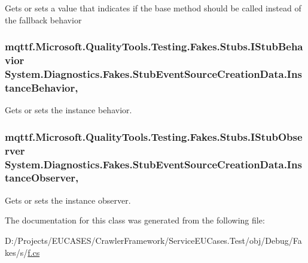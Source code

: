 Gets or sets a value that indicates if the base method should be called instead of the fallback behavior

\hypertarget{class_system_1_1_diagnostics_1_1_fakes_1_1_stub_event_source_creation_data_ae07d514ac61c8953604d50860017bc9e}{
\subsubsection[{Instance\-Behavior}]{\setlength{\rightskip}{0pt plus 5cm}mqttf.\-Microsoft.\-Quality\-Tools.\-Testing.\-Fakes.\-Stubs.\-I\-Stub\-Behavior System.\-Diagnostics.\-Fakes.\-Stub\-Event\-Source\-Creation\-Data.\-Instance\-Behavior\hspace{0.3cm}{\ttfamily [get]}, {\ttfamily [set]}}}\label{class_system_1_1_diagnostics_1_1_fakes_1_1_stub_event_source_creation_data_ae07d514ac61c8953604d50860017bc9e}


Gets or sets the instance behavior.

\hypertarget{class_system_1_1_diagnostics_1_1_fakes_1_1_stub_event_source_creation_data_a37dd1f8fe9d58d60c8bbe444b2d23822}{
\subsubsection[{Instance\-Observer}]{\setlength{\rightskip}{0pt plus 5cm}mqttf.\-Microsoft.\-Quality\-Tools.\-Testing.\-Fakes.\-Stubs.\-I\-Stub\-Observer System.\-Diagnostics.\-Fakes.\-Stub\-Event\-Source\-Creation\-Data.\-Instance\-Observer\hspace{0.3cm}{\ttfamily [get]}, {\ttfamily [set]}}}\label{class_system_1_1_diagnostics_1_1_fakes_1_1_stub_event_source_creation_data_a37dd1f8fe9d58d60c8bbe444b2d23822}


Gets or sets the instance observer.



The documentation for this class was generated from the following file\-:\begin{DoxyCompactItemize}
\item 
D\-:/\-Projects/\-E\-U\-C\-A\-S\-E\-S/\-Crawler\-Framework/\-Service\-E\-U\-Cases.\-Test/obj/\-Debug/\-Fakes/s/\hyperlink{s_2f_8cs}{f.\-cs}\end{DoxyCompactItemize}
